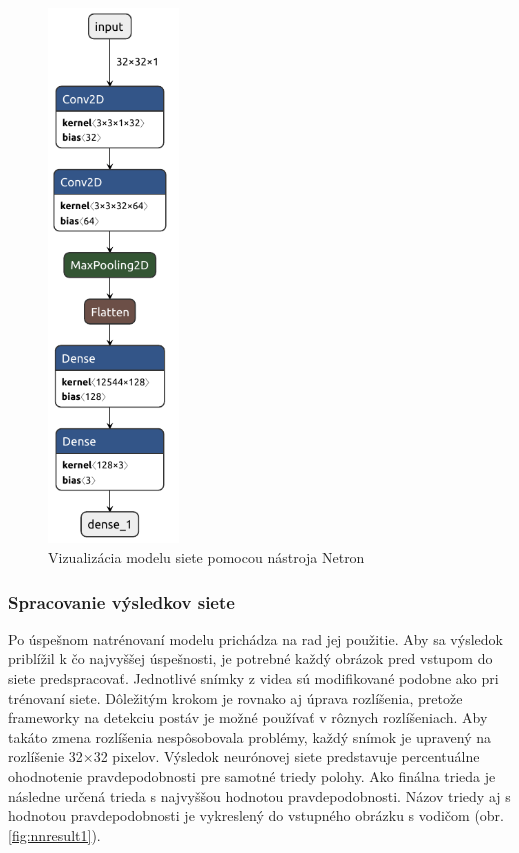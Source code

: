 \documentclass[slovak,master,dept460,male,cpp,cpdeclaration]{diploma}
\begin{document}
\begin{figure}[H]
	\centering
	\includegraphics[width=0.31\textwidth]{Figures/defaultModel.pdf}
	\caption{Vizualizácia modelu siete pomocou nástroja Netron\cite{netron}}
	\label{fig:modelNN}
\end{figure}

\newpage
\subsubsection*{Spracovanie výsledkov siete}
Po úspešnom natrénovaní modelu prichádza na rad jej použitie. Aby sa výsledok priblížil k čo najvyššej úspešnosti, je potrebné každý obrázok pred vstupom do siete predspracovať. Jednotlivé snímky z videa sú modifikované podobne ako pri trénovaní siete. Dôležitým krokom je rovnako aj úprava rozlíšenia, pretože frameworky na detekciu postáv  je možné používať v rôznych rozlíšeniach. Aby takáto zmena rozlíšenia nespôsobovala problémy, každý snímok je upravený na rozlíšenie 32$\times$32 pixelov. Výsledok neurónovej siete  predstavuje percentuálne ohodnotenie pravdepodobnosti pre  samotné triedy polohy. Ako finálna trieda je následne určená trieda s najvyššou hodnotou pravdepodobnosti. Názov triedy aj s hodnotou pravdepodobnosti je vykreslený do vstupného obrázku s vodičom (obr. \ref{fig:nnresult1}).\par
\end{document}
